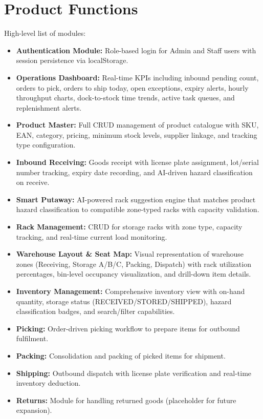 \documentclass[12pt,a4paper]{report}
\begin{document}
\section{Product Functions}
High-level list of modules:
\begin{itemize}
    \item \textbf{Authentication Module:} Role-based login for Admin and Staff users with session persistence via localStorage.
    \item \textbf{Operations Dashboard:} Real-time KPIs including inbound pending count, orders to pick, orders to ship today, open exceptions, expiry alerts, hourly throughput charts, dock-to-stock time trends, active task queues, and replenishment alerts.
    \item \textbf{Product Master:} Full CRUD management of product catalogue with SKU, EAN, category, pricing, minimum stock levels, supplier linkage, and tracking type configuration.
    \item \textbf{Inbound Receiving:} Goods receipt with license plate assignment, lot/serial number tracking, expiry date recording, and AI-driven hazard classification on receive.
    \item \textbf{Smart Putaway:} AI-powered rack suggestion engine that matches product hazard classification to compatible zone-typed racks with capacity validation.
    \item \textbf{Rack Management:} CRUD for storage racks with zone type, capacity tracking, and real-time current load monitoring.
    \item \textbf{Warehouse Layout \& Seat Map:} Visual representation of warehouse zones (Receiving, Storage A/B/C, Packing, Dispatch) with rack utilization percentages, bin-level occupancy visualization, and drill-down item details.
    \item \textbf{Inventory Management:} Comprehensive inventory view with on-hand quantity, storage status (RECEIVED/STORED/SHIPPED), hazard classification badges, and search/filter capabilities.
    \item \textbf{Picking:} Order-driven picking workflow to prepare items for outbound fulfilment.
    \item \textbf{Packing:} Consolidation and packing of picked items for shipment.
    \item \textbf{Shipping:} Outbound dispatch with license plate verification and real-time inventory deduction.
    \item \textbf{Returns:} Module for handling returned goods (placeholder for future expansion).

\end{itemize}
\end{document}
